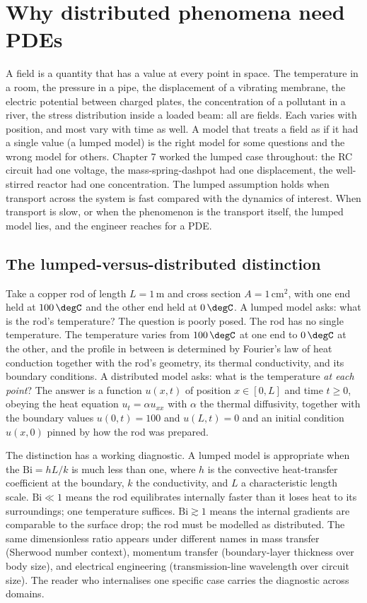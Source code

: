 \section{Why distributed phenomena need PDEs}

A field is a quantity that has a value at every point in space. The
temperature in a room, the pressure in a pipe, the displacement of
a vibrating membrane, the electric potential between charged
plates, the concentration of a pollutant in a river, the stress
distribution inside a loaded beam: all are fields. Each varies
with position, and most vary with time as well. A model that
treats a field as if it had a single value (a lumped model) is the
right model for some questions and the wrong model for others.
Chapter 7 worked the lumped case throughout: the RC circuit had
one voltage, the mass-spring-dashpot had one displacement, the
well-stirred reactor had one concentration. The lumped assumption
holds when transport across the system is fast compared with the
dynamics of interest. When transport is slow, or when the
phenomenon is the transport itself, the lumped model lies, and the
engineer reaches for a PDE.

\subsection{The lumped-versus-distributed distinction}

Take a copper rod of length $L = 1\,\si{\meter}$ and cross section
$A = 1\,\si{\centi\meter\squared}$, with one end held at
$100\,\degC$ and the other end held at $0\,\degC$. A lumped model
asks: what is the rod's temperature? The question is poorly posed.
The rod has no single temperature. The temperature varies from
$100\,\degC$ at one end to $0\,\degC$ at the other, and the
profile in between is determined by Fourier's law of heat
conduction together with the rod's geometry, its thermal
conductivity, and its boundary conditions. A distributed model
asks: what is the temperature \textit{at each point}? The answer
is a function $u(x, t)$ of position $x \in [0, L]$ and time $t \geq
0$, obeying the heat equation $u_{t} = \alpha u_{xx}$ with
$\alpha$ the thermal diffusivity, together with the boundary
values $u(0, t) = 100$ and $u(L, t) = 0$ and an initial condition
$u(x, 0)$ pinned by how the rod was prepared.

The distinction has a working diagnostic. A lumped model is
appropriate when the  $\text{Bi} = h L / k$
is much less than one, where $h$ is the convective heat-transfer
coefficient at the boundary, $k$ the conductivity, and $L$ a
characteristic length scale. $\text{Bi} \ll 1$ means the rod
equilibrates internally faster than it loses heat to its
surroundings; one temperature suffices. $\text{Bi} \gtrsim 1$
means the internal gradients are comparable to the surface drop;
the rod must be modelled as distributed. The same dimensionless
ratio appears under different names in mass transfer
(Sherwood number context), momentum transfer (boundary-layer
thickness over body size), and electrical engineering
(transmission-line wavelength over circuit size). The reader who
internalises one specific case carries the diagnostic across
domains.

